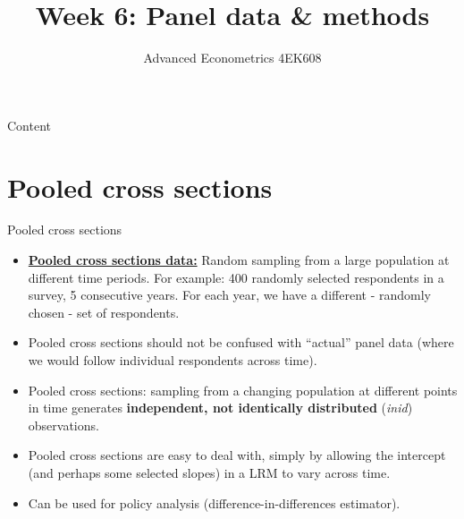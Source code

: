 \documentclass[usenames,dvipsnames]{beamer}
\title[Week6]{Week 6: Panel data \& methods}
\author{Advanced Econometrics 4EK608}
\institute{Vysoká škola ekonomická v Praze}
\date{}
\begin{document}
 
\begin{frame}
  \titlepage
\end{frame}

\begin{frame}{Content}
  \tableofcontents
\end{frame}

\section{Pooled cross sections}
\begin{frame}{Pooled cross sections}
\begin{itemize}
\item \underline{\textbf{Pooled cross sections data:}}
Random sampling from a large population at different time periods. For example: 400 randomly selected respondents in a survey, 5 consecutive years. For each year, we have a different - randomly chosen - set of respondents. 
\item Pooled cross sections should not be confused with “actual” panel data (where we would follow individual respondents across time). 
\item Pooled cross sections: sampling from a changing population at different points in time generates \textbf{independent, not identically distributed} (\textit{inid}) observations. 
\item Pooled cross sections are easy to deal with, simply by allowing the intercept (and perhaps some selected slopes) in a LRM to vary across time. 
\item Can be used for policy analysis (difference-in-differences estimator). 
\end{itemize}
\end{frame}
\end{document}
